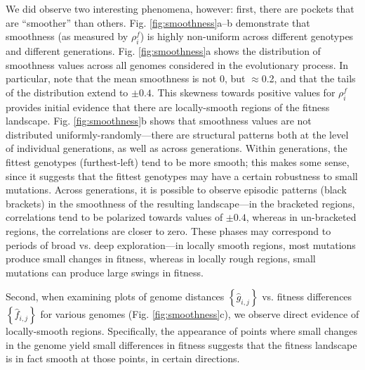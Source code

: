 \documentclass[twocolumn]{article}
\newcommand{\set}[1]{\left\{#1\right\}}
\begin{document}
We did observe two interesting phenomena, however: first, there are pockets that are ``smoother'' than others. Fig. \ref{fig:smoothness}a--b demonstrate that smoothness (as measured by $\rho_i^f$) is highly non-uniform across different genotypes and different generations. Fig. \ref{fig:smoothness}a shows the distribution of smoothness values across all genomes considered in the evolutionary process. In particular, note that the mean smoothness is not 0, but $\approx$0.2, and that the tails of the distribution extend to $\pm0.4$. This skewness towards positive values for $\rho_i^f$ provides initial evidence that there are locally-smooth regions of the fitness landscape. Fig. \ref{fig:smoothness}b shows that smoothness values are not distributed uniformly-randomly---there are structural patterns both at the level of individual generations, as well as across generations. Within generations, the fittest genotypes (furthest-left) tend to be more smooth; this makes some sense, since it suggests that the fittest genotypes may have a certain robustness to small mutations. Across generations, it is possible to observe episodic patterns (black brackets) in the smoothness of the resulting landscape---in the bracketed regions, correlations tend to be polarized towards values of $\pm0.4$, whereas in un-bracketed regions, the correlations are closer to zero. These phases may correspond to periods of broad vs. deep exploration---in locally smooth regions, most mutations produce small changes in fitness, whereas in locally rough regions, small mutations can produce large swings in fitness.

Second, when examining plots of genome distances $\set{\hat{g}_{i,j}}$ vs. fitness differences $\set{\hat{f}_{i,j}}$ for various genomes (Fig. \ref{fig:smoothness}c), we observe direct evidence of locally-smooth regions. Specifically, the appearance of points where small changes in the genome yield small differences in fitness suggests that the fitness landscape is in fact smooth at those points, in certain directions.
\end{document}
